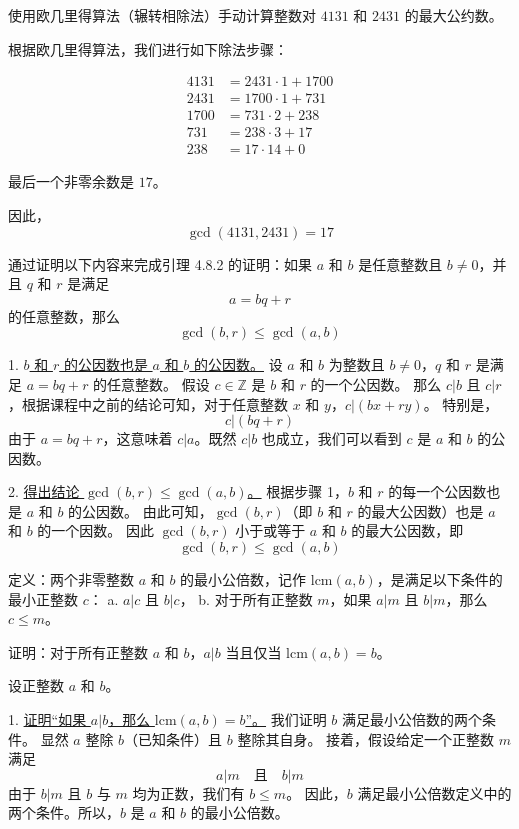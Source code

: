 \begin{questions}

    \question
使用欧几里得算法（辗转相除法）手动计算整数对 $4131$ 和 $2431$ 的最大公约数。

\begin{solution}
根据欧几里得算法，我们进行如下除法步骤：

\begin{align*}
4131 &= 2431 \cdot 1 + 1700 \\
2431 &= 1700 \cdot 1 + 731 \\
1700 &= 731 \cdot 2 + 238 \\
731 &= 238 \cdot 3 + 17 \\
238 &= 17 \cdot 14 + 0
\end{align*}

最后一个非零余数是 $17$。

因此，
\[
\gcd(4131, 2431) = 17
\]
\end{solution}

\question
通过证明以下内容来完成引理 4.8.2 的证明：如果 $a$ 和 $b$ 是任意整数且 $b \neq 0$，并且 $q$ 和 $r$ 是满足
\[
a = bq + r
\]
的任意整数，那么
\[
\gcd(b, r) \le \gcd(a, b)
\]

\begin{solution}
1. \underline{$b$ 和 $r$ 的公因数也是 $a$ 和 $b$ 的公因数。}
设 $a$ 和 $b$ 为整数且 $b \neq 0$，$q$ 和 $r$ 是满足 $a = bq + r$ 的任意整数。
假设 $c \in \mathbb{Z}$ 是 $b$ 和 $r$ 的一个公因数。
那么 $c|b$ 且 $c|r$，根据课程中之前的结论可知，对于任意整数 $x$ 和 $y$，$c|(bx + ry)$。
特别是，
\[
c|(bq + r)
\]
由于 $a = bq + r$，这意味着 $c|a$。既然 $c|b$ 也成立，我们可以看到 $c$ 是 $a$ 和 $b$ 的公因数。

2. \underline{得出结论 $\gcd(b, r) \le \gcd(a, b)$。}
根据步骤 1，$b$ 和 $r$ 的每一个公因数也是 $a$ 和 $b$ 的公因数。
由此可知，$\gcd(b, r)$（即 $b$ 和 $r$ 的最大公因数）也是 $a$ 和 $b$ 的一个因数。
因此 $\gcd(b, r)$ 小于或等于 $a$ 和 $b$ 的最大公因数，即
\[
\gcd(b, r) \le \gcd(a, b)
\]
\end{solution}

\question
定义：两个非零整数 $a$ 和 $b$ 的最小公倍数，记作 $\text{lcm}(a, b)$，是满足以下条件的最小正整数 $c$：
a. $a|c$ 且 $b|c$，
b. 对于所有正整数 $m$，如果 $a|m$ 且 $b|m$，那么 $c \le m$。

证明：对于所有正整数 $a$ 和 $b$，$a|b$ 当且仅当 $\text{lcm}(a, b) = b$。

\begin{solution}
设正整数 $a$ 和 $b$。

1. \underline{证明“如果 $a|b$，那么 $\text{lcm}(a, b) = b$”。}
我们证明 $b$ 满足最小公倍数的两个条件。
显然 $a$ 整除 $b$（已知条件）且 $b$ 整除其自身。
接着，假设给定一个正整数 $m$ 满足
\[
a|m \quad \text{且} \quad b|m
\]
由于 $b|m$ 且 $b$ 与 $m$ 均为正数，我们有 $b \le m$。
因此，$b$ 满足最小公倍数定义中的两个条件。所以，$b$ 是 $a$ 和 $b$ 的最小公倍数。


\end{solution}
\end{questions}
